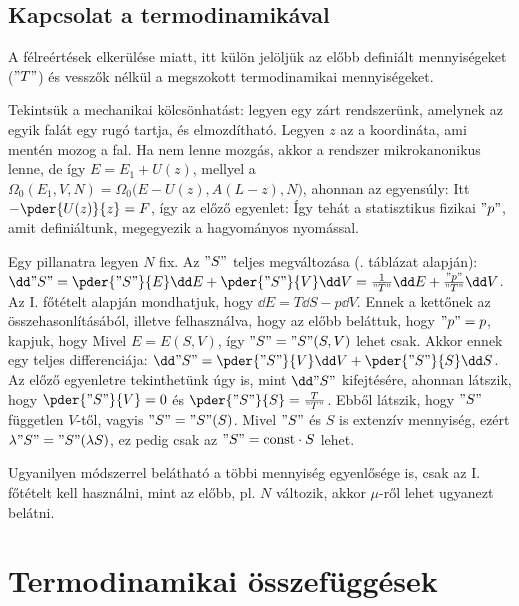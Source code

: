   \subsection{Kapcsolat a termodinamikával} 
   
   A félreértések elkerülése miatt, itt külön jelöljük az előbb definiált mennyiségeket ($"T"$) és vesszők nélkül a megszokott termodinamikai mennyiségeket. 
   
   Tekintsük a mechanikai kölcsönhatást: legyen egy zárt rendszerünk, amelynek az egyik falát egy rugó tartja, és elmozdítható.
   Legyen $z$ az a koordináta, ami mentén mozog a fal.
   Ha nem lenne mozgás, akkor a rendszer mikrokanonikus lenne, de így $E=E_1+U(z)$, mellyel a $\Omega_{0}(E_1,V,N)=\Omega_{0}\big(E-U(z),A(L-z),N\big)$, ahonnan az egyensúly:
   Itt $-\pder{U(z)}{z}=F$, így az előző egyenlet:
   Így tehát a statisztikus fizikai $"p"$, amit definiáltunk, megegyezik a hagyományos nyomással. 
   
   Egy pillanatra legyen $N$ fix.
   Az $"S"$ teljes megváltozása (. táblázat alapján): $\dd"S"=\pder{"S"}{E}\dd E+\pder{"S"}{V}\dd V=\frac{1}{"T"}\dd E+\frac{"p"}{"T"}\dd V$.
   Az I. főtételt alapján mondhatjuk, hogy $\dd E=T\dd S-p\dd V$.
   Ennek a kettőnek az összehasonlításából, illetve felhasználva, hogy az előbb beláttuk, hogy $"p"=p$, kapjuk, hogy 
   Mivel $E=E(S,V)$, így $"S"="S"(S,V)$ lehet csak.
   Akkor ennek egy teljes differenciája: $\dd"S"=\pder{"S"}{V}\dd V+\pder{"S"}{S}\dd S$.
   Az előző egyenletre tekinthetünk úgy is, mint $\dd "S"$ kifejtésére, ahonnan látszik, hogy $\pder{"S"}{V}=0$ és $\pder{"S"}{S}=\frac{T}{"T"}$.
   Ebből látszik, hogy $"S"$ független $V$-től, vagyis $"S"="S"(S)$.
   Mivel $"S"$ és $S$ is extenzív mennyiség, ezért $\lambda"S"="S"(\lambda S)$, ez pedig csak az $"S"=\text{const}\cdot S$ lehet. 
   
   Ugyanilyen módszerrel belátható a többi mennyiség egyenlősége is, csak az I. főtételt kell használni, mint az előbb, pl. $N$ változik, akkor $\mu$-ről lehet ugyanezt belátni.
   
  \section{Termodinamikai összefüggések}
   
